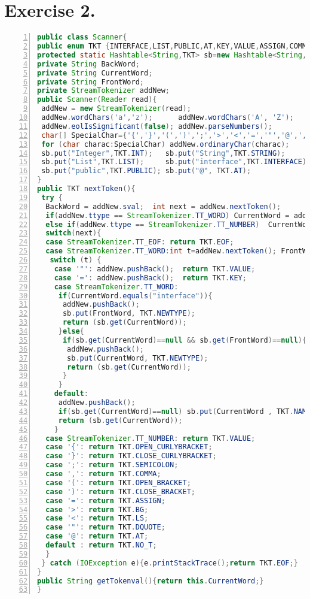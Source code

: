 \documentclass[10pt]{report}
\begin{document}
\section{Exercise 2.}
\label{ScannerClass}
\begin{lstlisting}[numbers=left,language=Java,frame=single,breaklines=true,label=Code:ReadGraph, caption=Scanner Class.]
public class Scanner{
public enum TKT {INTERFACE,LIST,PUBLIC,AT,KEY,VALUE,ASSIGN,COMMA,NEWTYPE,NULL,DQUOTE,SEMICOLON,OPEN_CURLYBRACKET,CLOSE_CURLYBRACKET,OPEN_BRACKET,CLOSE_BRACKET,INT,STRING,EOF,EOA,NO_T,BG,LS,NAME,NUMBER,};
protected static Hashtable<String,TKT> sb=new Hashtable<String,TKT>();
private String BackWord;
private String CurrentWord;
private String FrontWord;
private StreamTokenizer addNew;	
public Scanner(Reader read){
 addNew = new StreamTokenizer(read);
 addNew.wordChars('a','z');      addNew.wordChars('A', 'Z'); 
 addNew.eolIsSignificant(false); addNew.parseNumbers();
 char[] SpecialChar={'{','}','(',')',';','>','<','=','"','@',','};
 for (char charac:SpecialChar) addNew.ordinaryChar(charac);
 sb.put("Integer",TKT.INT);   sb.put("String",TKT.STRING);
 sb.put("List",TKT.LIST);     sb.put("interface",TKT.INTERFACE);
 sb.put("public",TKT.PUBLIC); sb.put("@", TKT.AT);
}
public TKT nextToken(){
 try {
  BackWord = addNew.sval;  int next = addNew.nextToken();
  if(addNew.ttype == StreamTokenizer.TT_WORD) CurrentWord = addNew.sval;
  else if(addNew.ttype == StreamTokenizer.TT_NUMBER)  CurrentWord = String.valueOf(addNew.nval);
  switch(next){
  case StreamTokenizer.TT_EOF: return TKT.EOF;
  case StreamTokenizer.TT_WORD:int t=addNew.nextToken(); FrontWord=addNew.sval;
   switch (t) {
    case '"': addNew.pushBack();  return TKT.VALUE;
    case '=': addNew.pushBack();  return TKT.KEY;
    case StreamTokenizer.TT_WORD:
     if(CurrentWord.equals("interface")){
      addNew.pushBack();
      sb.put(FrontWord, TKT.NEWTYPE);
      return (sb.get(CurrentWord));
     }else{
      if(sb.get(CurrentWord)==null && sb.get(FrontWord)==null){
       addNew.pushBack();
       sb.put(CurrentWord, TKT.NEWTYPE);
       return (sb.get(CurrentWord));
      }
     }
    default:
     addNew.pushBack();
     if(sb.get(CurrentWord)==null) sb.put(CurrentWord , TKT.NAME);
     return (sb.get(CurrentWord));
    }
  case StreamTokenizer.TT_NUMBER: return TKT.VALUE;
  case '{': return TKT.OPEN_CURLYBRACKET;
  case '}': return TKT.CLOSE_CURLYBRACKET;
  case ';': return TKT.SEMICOLON;
  case ',': return TKT.COMMA;
  case '(': return TKT.OPEN_BRACKET;
  case ')': return TKT.CLOSE_BRACKET;
  case '=': return TKT.ASSIGN;
  case '>': return TKT.BG;
  case '<': return TKT.LS;
  case '"': return TKT.DQUOTE;
  case '@': return TKT.AT;
  default : return TKT.NO_T; 
  }
 } catch (IOException e){e.printStackTrace();return TKT.EOF;}
}
public String getTokenval(){return this.CurrentWord;}
}
\end{lstlisting}
\end{document}
